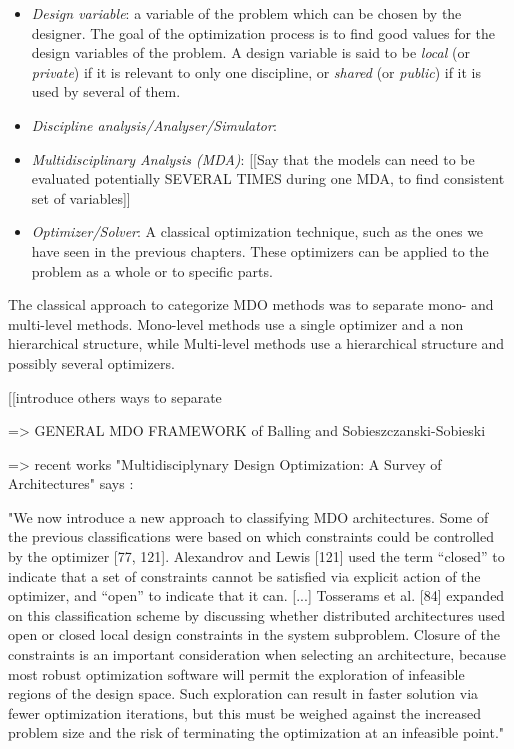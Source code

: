 \begin{itemize}

\item \emph{Design variable}: a variable of the problem which can be chosen by the designer. The goal of the optimization process is to find good values for the design variables of the problem. A design variable is said to be \emph{local} (or \emph{private}) if it is relevant to only one discipline, or \emph{shared} (or \emph{public}) if it is used by several of them.

\item \emph{Discipline analysis/Analyser/Simulator}: 

\item \emph{Multidisciplinary Analysis (MDA)}: [[Say that the models can need to be evaluated potentially SEVERAL TIMES during one MDA, to find consistent set of variables]]

\item \emph{Optimizer/Solver}: A classical optimization technique, such as the ones we have seen in the previous chapters. These optimizers can be applied to the problem as a whole or to specific parts.

\end{itemize}



The classical approach to categorize MDO methods was to separate mono- and multi-level methods.
Mono-level methods use a single optimizer and a non hierarchical structure, while Multi-level methods use a hierarchical structure and possibly several optimizers.

[[introduce others ways to separate

=> GENERAL MDO FRAMEWORK of Balling and Sobieszczanski-Sobieski

=> recent works "Multidisciplynary Design Optimization: A Survey of Architectures" says : 

"We now introduce a new approach to classifying MDO architectures. Some of the previous classifications were based on which constraints could be controlled by the optimizer [77, 121]. Alexandrov and Lewis [121] used the term “closed” to indicate that a set of constraints cannot be satisfied via explicit action of the optimizer, and “open” to indicate that it can.
[...]
Tosserams et al. [84] expanded on this classification
scheme by discussing whether distributed architectures used open or closed local design constraints in the system subproblem. Closure of the constraints is an important consideration when selecting an architecture, because most robust optimization software will permit the exploration of infeasible regions of the design space. Such exploration can result in faster solution via fewer optimization iterations, but this must be weighed against the increased problem size and the risk of terminating the optimization at an infeasible point."


